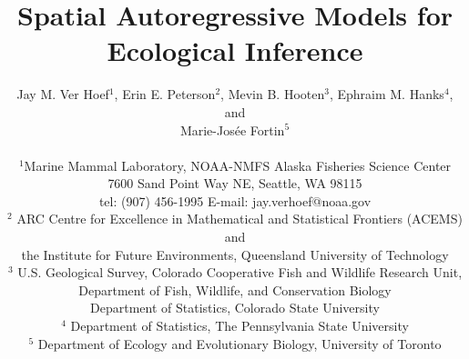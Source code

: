 \documentclass[11pt, titlepage]{article}\usepackage[]{graphicx}\usepackage[]{color}
\begin{document}

\titlepage
\title {Spatial Autoregressive Models for Ecological Inference}
\author{Jay M. Ver Hoef$^1$, Erin E. Peterson$^2$, Mevin B. Hooten$^3$, Ephraim M. Hanks$^4$, and \\
	Marie-Jos\'{e}e Fortin$^5$ \\
\hrulefill \\ 
$^1$Marine Mammal Laboratory, NOAA-NMFS Alaska Fisheries Science Center\\
7600 Sand Point Way NE, Seattle, WA 98115\\
tel: (907) 456-1995 \hspace{.5cm} E-mail: jay.verhoef@noaa.gov\\
$^2$ ARC Centre for Excellence in Mathematical and Statistical Frontiers (ACEMS) and \\
the Institute for Future Environments, Queensland University of Technology \\ 
$^3$ U.S. Geological Survey, Colorado Cooperative Fish and Wildlife Research Unit, \\
Department of Fish, Wildlife, and Conservation Biology \\
Department of Statistics, Colorado State University \\
$^4$ Department of Statistics, The Pennsylvania State University \\
$^5$ Department of Ecology and Evolutionary Biology, University of Toronto \\
\hrulefill \\
}

\maketitle

\end{document}

